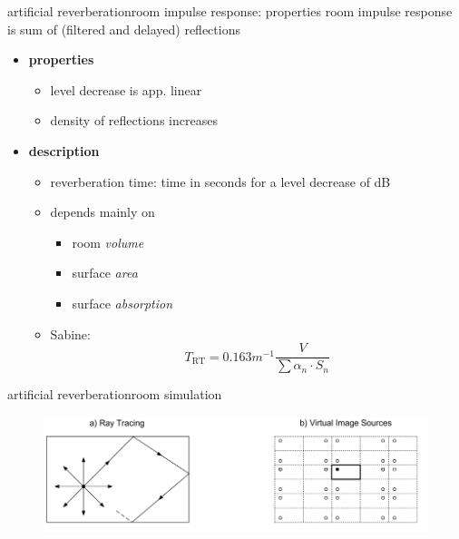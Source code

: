 \begin{frame}{artificial reverberation}{room impulse response: properties}
	\vspace{-3mm}
    room impulse response is sum of (filtered and delayed) reflections
	\pause
	
	\begin{itemize}
		\item	\textbf{properties}
			\begin{itemize}
				\item	level decrease is app. linear
				\item	density of reflections increases
			\end{itemize}
		\pause
        \bigskip
		\item	\textbf{description}
			\begin{itemize}
				\item	reverberation time: time in seconds for a level decrease of \unit[60]{dB}
				\item	depends mainly on
					\begin{itemize}
						\item	room \textit{volume}
						\item	surface \textit{area}
						\item	surface \textit{absorption}
					\end{itemize}
				\item	Sabine:
					\begin{equation*}
						T_\mathrm{RT} = 0.163 \unit{m^{-1}} \frac{V}{\sum{\alpha_n\cdot S_n}}
					\end{equation*}
			\end{itemize}
	\end{itemize}
\end{frame}

\begin{frame}{artificial reverberation}{room simulation}
	\begin{figure}
		\centerline{\includegraphics[scale=.4]{graph/raummodell}}
	\end{figure}
\end{frame}

